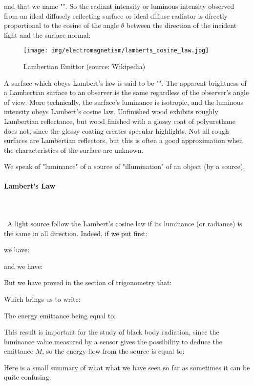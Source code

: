 	and that we name "". So  the radiant intensity or luminous intensity observed from an ideal diffusely reflecting surface or ideal diffuse radiator is directly proportional to the cosine of the angle $\theta$ between the direction of the incident light and the surface normal:
	\begin{figure}[H]
		\centering
		\texttt{[image: img/electromagnetism/lamberts\_cosine\_law.jpg]}
		\caption{Lambertian Emittor (source: Wikipedia)}
	\end{figure}
	A surface which obeys Lambert's law is said to be "". The apparent brightness of a Lambertian surface to an observer is the same regardless of the observer's angle of view. More technically, the surface's luminance is isotropic, and the luminous intensity obeys Lambert's cosine law. Unfinished wood exhibits roughly Lambertian reflectance, but wood finished with a glossy coat of polyurethane does not, since the glossy coating creates specular highlights. Not all rough surfaces are Lambertian reflectors, but this is often a good approximation when the characteristics of the surface are unknown.
	\begin{tcolorbox}[title=Remark,colframe=black,arc=10pt]
	We speak of "luminance" of a source of "illumination" of an object (by a source).
	\end{tcolorbox}
	
	\pagebreak
	\paragraph{Lambert's Law}\mbox{}\\\\\
	A light source follow the Lambert's cosine law if its luminance (or radiance) is the same in all direction. Indeed, if we put first:
	
	we have:
	
	and we have:
	
	But we have proved in the section of trigonometry that:
	
	Which brings us to write:
	
	The energy emittance being equal to:
	
	This result is important for the study of black body radiation, since the luminance value measured by a sensor gives the possibility to deduce the emittance $M$, so the energy flow from the source is equal to: 
	

	Here is a small summary of what what we have seen so far as sometimes it can be quite confusing:
	
